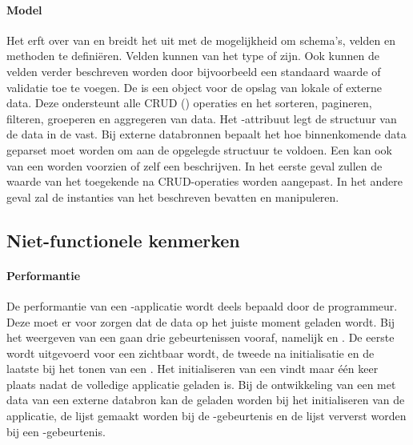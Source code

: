 \paragraph{Model}
Het  erft over van  en breidt het uit met de mogelijkheid om schema's,  velden en methoden te definiëren.  
Velden kunnen van het type  of  zijn.
Ook kunnen de velden verder beschreven worden door bijvoorbeeld een standaard waarde of validatie toe te voegen.
De  is een \kendo{} object voor de opslag van lokale of externe data.  
Deze ondersteunt alle CRUD () operaties en het sorteren, pagineren, filteren, groeperen en aggregeren van data.
Het -attribuut legt de structuur van de data in de  vast.
Bij externe databronnen bepaalt het hoe binnenkomende data geparset moet worden om aan de opgelegde structuur te voldoen.
Een  kan ook van een  worden voorzien of zelf een  beschrijven.
In het eerste geval zullen de waarde van het toegekende  na CRUD-operaties worden aangepast.
In het andere geval zal de  instanties van het beschreven  bevatten en manipuleren.

\subsection{Niet-functionele kenmerken}
\label{sec:kendo-niet-functioneel}

\paragraph{Performantie}
De performantie van een \kendo{}-applicatie wordt deels bepaald door de programmeur.
Deze moet er voor zorgen dat de data op het juiste moment geladen wordt.
Bij het weergeven van een  gaan drie gebeurtenissen vooraf,  namelijk  en .
De eerste wordt uitgevoerd voor een  zichtbaar wordt,  de tweede na initialisatie en de laatste bij het tonen van een .
Het initialiseren van een  vindt maar één keer plaats nadat de volledige applicatie geladen is.
Bij de ontwikkeling van een  met data van een externe databron kan  de  geladen worden bij het initialiseren van de applicatie,  de lijst gemaakt worden bij de -gebeurtenis en de lijst ververst worden bij een -gebeurtenis.

